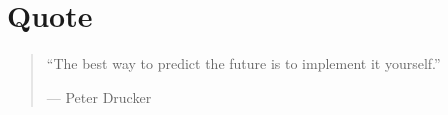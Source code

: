 \chapter*{Quote}

\begin{quote}
``The best way to predict the future is to implement it yourself.''
\begin{flushright}
--- Peter Drucker
\end{flushright}
\end{quote} 